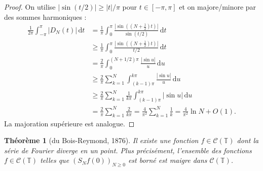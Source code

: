 \documentclass[a4paper,12pt]{book}
\newcommand{\dd}{\mathrm{d}}
\newcommand{\abs}[1]{\left| #1 \right|}
\theoremstyle{definition}
\theoremstyle{plain}
\newtheorem{theoreme}[definition]{Théorème}
\theoremstyle{remark}
\begin{document}
\begin{proof}
On utilise $\abs{\sin(t/2)} \geq \abs{t}/\pi$ pour $t \in [-\pi, \pi]$ et on majore/minore
par des sommes harmoniques :
\begin{align*}
  \frac{1}{2\pi}\int_{-\pi}^{\pi} \abs{D_N(t)}\, \dd t
  &= \frac{1}{\pi}\int_0^{\pi} \frac{\abs{\sin((N+\tfrac{1}{2})t)}}{\sin(t/2)}\, \dd t \\
  &\geq \frac{1}{\pi}\int_0^{\pi} \frac{\abs{\sin((N+\tfrac{1}{2})t)}}{t/2}\, \dd t \\
  &= \frac{2}{\pi}\int_0^{(N+1/2)\pi} \frac{\abs{\sin u}}{u}\, \dd u \\
  &\geq \frac{2}{\pi} \sum_{k=1}^{N} \int_{(k-1)\pi}^{k\pi} \frac{\abs{\sin u}}{u}\, \dd u \\
  &\geq \frac{2}{\pi} \sum_{k=1}^{N} \frac{1}{k\pi} \int_{(k-1)\pi}^{k\pi} \abs{\sin u}\, \dd u \\
  &= \frac{2}{\pi} \sum_{k=1}^{N} \frac{2}{k\pi}
  = \frac{4}{\pi^2} \sum_{k=1}^{N} \frac{1}{k}
  = \frac{4}{\pi^2}\ln N + O(1).
\end{align*}
La majoration supérieure est analogue.
\end{proof}

\begin{theoreme}[du Bois-Reymond, 1876]
\label{thm:du-bois-reymond}
Il existe une fonction $f \in \mathcal{C}(\mathbb{T})$
dont la série de Fourier diverge en un point. Plus précisément,
l'ensemble des fonctions $f \in \mathcal{C}(\mathbb{T})$ telles que
$(S_N f(0))_{N \geq 0}$ est borné est maigre dans $\mathcal{C}(\mathbb{T})$.
\end{theoreme}
\end{document}
